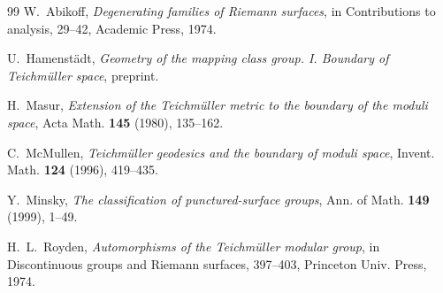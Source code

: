 \documentclass[11pt]{article}
\theoremstyle{plain}
\theoremstyle{definition}
\begin{document}
\begin{thebibliography}{99}
W.~Abikoff, \emph{Degenerating families of Riemann surfaces}, in Contributions to analysis, 29--42, Academic Press, 1974.

U.~Hamenst\"adt, \emph{Geometry of the mapping class group. I. Boundary of Teichm\"uller space}, preprint.

H.~Masur, \emph{Extension of the Teichm\"uller metric to the boundary of the moduli space}, Acta Math. \textbf{145} (1980), 135--162.

C.~McMullen, \emph{Teichm\"uller geodesics and the boundary of moduli space}, Invent. Math. \textbf{124} (1996), 419--435.

Y.~Minsky, \emph{The classification of punctured-surface groups}, Ann. of Math. \textbf{149} (1999), 1--49.

H.~L.~Royden, \emph{Automorphisms of the Teichm\"uller modular group}, in Discontinuous groups and Riemann surfaces, 397--403, Princeton Univ. Press, 1974.
\end{thebibliography}
\end{document}

